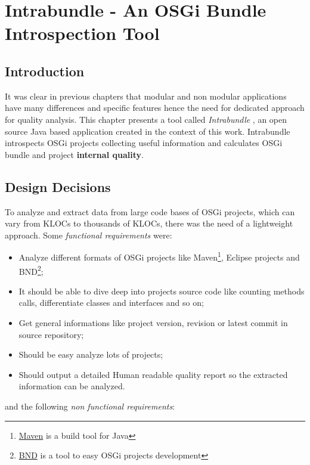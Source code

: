 \chapter{Intrabundle - An OSGi Bundle Introspection Tool}


\section{Introduction}
It was clear in previous chapters that modular and non modular applications have many differences and specific features hence the need for dedicated approach for quality analysis. This chapter presents a tool called \emph{Intrabundle} \citep{intrabundle github 2014}, an open source Java based application created in the context of this work. Intrabundle introspects OSGi projects collecting useful information and calculates OSGi bundle and project \textbf{internal quality}.  


\section{Design Decisions}
To analyze and extract data from large code bases of OSGi projects, which can vary from KLOCs to thousands of KLOCs, there was the need of a lightweight approach. Some \emph{functional requirements} were:

\begin{itemize}
\item Analyze different formats of OSGi projects like Maven\footnote{\href{http://maven.apache.org/index.html}{Maven} is a build tool for Java}, Eclipse projects and BND\footnote{\href{http://bndtools.org/}{BND} is a tool to easy OSGi projects development}; 
\item It should be able to dive deep into projects source code like counting methods calls, differentiate classes and interfaces and so on;  
\item Get general informations like project version, revision or latest commit in source repository;
\item Should be easy analyze lots of projects;
\item Should output a detailed Human readable quality report so the extracted information can be analyzed.
\end{itemize}

and the following \emph{non functional requirements}:

